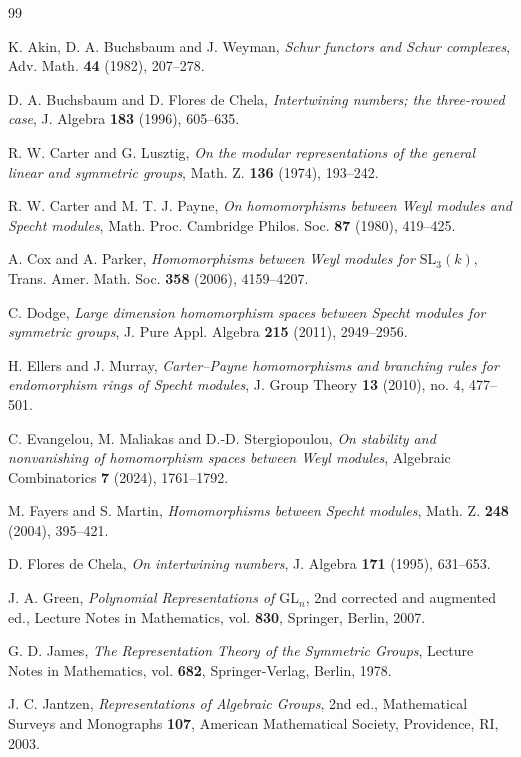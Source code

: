 \documentclass[11pt]{amsart}
\theoremstyle{remark}
\theoremstyle{definition}
\numberwithin{equation}{section}
\begin{document}
\begin{thebibliography}{99}

K. Akin, D. A. Buchsbaum and J. Weyman,
	\emph{Schur functors and Schur complexes},
	Adv. Math. \textbf{44} (1982), 207--278.

D. A. Buchsbaum and D. Flores de Chela,
\emph{Intertwining numbers; the three-rowed case},
J. Algebra \textbf{183} (1996), 605--635.


R. W. Carter and G. Lusztig,
	\emph{On the modular representations of the general linear and
		symmetric groups},
	Math. Z. \textbf{136} (1974), 193--242.

R. W. Carter and M. T. J. Payne,
	\emph{On homomorphisms between Weyl modules and Specht modules},
	Math. Proc. Cambridge Philos. Soc. \textbf{87} (1980), 419--425.

A. Cox and A. Parker,
	\emph{Homomorphisms between Weyl modules for $\mathrm{SL}_3(k)$},
	Trans. Amer. Math. Soc. \textbf{358} (2006), 4159--4207.

C. Dodge,
	\emph{Large dimension homomorphism spaces between Specht modules
		for symmetric groups},
	J. Pure Appl. Algebra \textbf{215} (2011), 2949--2956.

H. Ellers and J. Murray,
	\emph{Carter--Payne homomorphisms and branching rules for
		endomorphism rings of Specht modules},
	J. Group Theory \textbf{13} (2010), no. 4, 477--501.

C. Evangelou, M. Maliakas and D.-D. Stergiopoulou,
	\emph{On stability and nonvanishing of homomorphism spaces between
		Weyl modules},
	Algebraic Combinatorics \textbf{7} (2024), 1761--1792.

M. Fayers and S. Martin,
	\emph{Homomorphisms between Specht modules},
	Math. Z. \textbf{248} (2004), 395--421.

D. Flores de Chela,
	\emph{On intertwining numbers},
	J. Algebra \textbf{171} (1995), 631--653.

J. A. Green,
\emph{Polynomial Representations of $\mathrm{GL}_n$},
2nd corrected and augmented ed.,
Lecture Notes in Mathematics, vol. \textbf{830},
Springer, Berlin, 2007.

G. D. James,
	\emph{The Representation Theory of the Symmetric Groups},
	Lecture Notes in Mathematics, vol. \textbf{682},
	Springer-Verlag, Berlin, 1978.

J. C. Jantzen,
	\emph{Representations of Algebraic Groups},
	2nd ed., Mathematical Surveys and Monographs \textbf{107},
	American Mathematical Society, Providence, RI, 2003.




\end{thebibliography}
\end{document}
